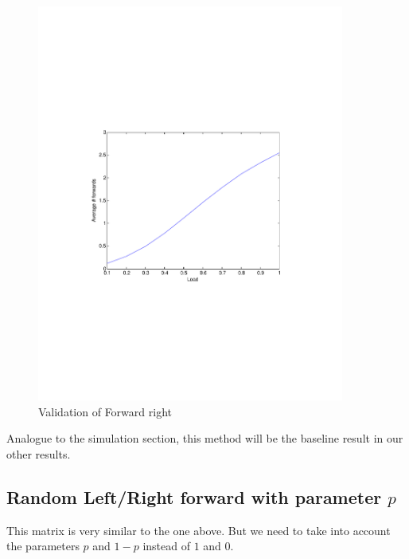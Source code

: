 \documentclass[10pt,a4paper]{article}
\begin{document}
\begin{figure}[h!tb]
\centering
\includegraphics[clip=true, trim=9em 24em 9em 24em, width=0.9\textwidth]{resources/plotright.pdf}
\caption{Validation of Forward right}
\label{validright}
\end{figure}

Analogue to the simulation section, this method will be the baseline result in our other results.

\subsection{Random Left/Right forward with parameter $p$}
This matrix is very similar to the one above. But we need to take into account the parameters $p$ and $1-p$ instead of $1$ and $0$.
\end{document}

